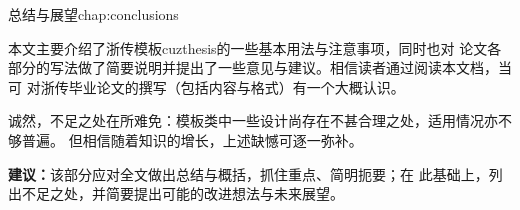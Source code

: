 \begin{cuzchapter}{总结与展望}{chap:conclusions}

本文主要介绍了浙传模板cuzthesis的一些基本用法与注意事项，同时也对
论文各部分的写法做了简要说明并提出了一些意见与建议。相信读者通过阅读本文档，当可
对浙传毕业论文的撰写（包括内容与格式）有一个大概认识。

诚然，不足之处在所难免：模板类中一些设计尚存在不甚合理之处，适用情况亦不够普遍。
但相信随着知识的增长，上述缺憾可逐一弥补。

\begin{leftbar}
    \noindent\textbf{建议：}该部分应对全文做出总结与概括，抓住重点、简明扼要；在
    此基础上，列出不足之处，并简要提出可能的改进想法与未来展望。
\end{leftbar}

\end{cuzchapter}